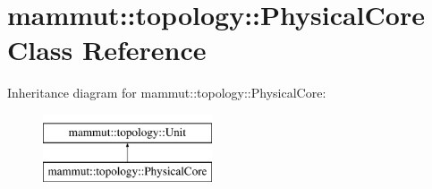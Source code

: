 \hypertarget{classmammut_1_1topology_1_1PhysicalCore}{\section{mammut\-:\-:topology\-:\-:Physical\-Core Class Reference}
\label{classmammut_1_1topology_1_1PhysicalCore}
}
Inheritance diagram for mammut\-:\-:topology\-:\-:Physical\-Core\-:\begin{figure}[H]
\begin{center}
\leavevmode
\includegraphics[height=2.000000cm]{classmammut_1_1topology_1_1PhysicalCore}
\end{center}
\end{figure}
